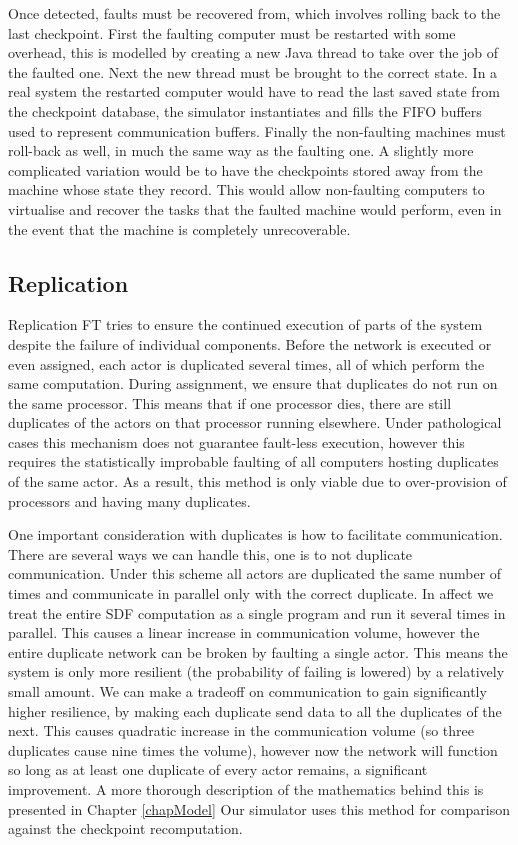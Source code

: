 Once detected, faults must be recovered from, which involves rolling back to the last checkpoint.
First the faulting computer must be restarted with some overhead, this is modelled by creating a new Java thread to take over the job of the faulted one.
Next the new thread must be brought to the correct state.
In a real system the restarted computer would have to read the last saved state from the checkpoint database, the simulator instantiates and fills the FIFO buffers used to represent communication buffers.
Finally the non-faulting machines must roll-back as well, in much the same way as the faulting one.
A slightly more complicated variation would be to have the checkpoints stored away from the machine whose state they record.
This would allow non-faulting computers to virtualise and recover the tasks that the faulted machine would perform, even in the event that the machine is completely unrecoverable.

\subsection{Replication}

Replication FT tries to ensure the continued execution of parts of the system despite the failure of individual components.
Before the network is executed or even assigned, each actor is duplicated several times, all of which perform the same computation.
During assignment, we ensure that duplicates do not run on the same processor.
This means that if one processor dies, there are still duplicates of the actors on that processor running elsewhere.
Under pathological cases this mechanism does not guarantee fault-less execution, however this requires the statistically improbable faulting of all computers hosting duplicates of the same actor.
As a result, this method is only viable due to over-provision of processors and having many duplicates.

One important consideration with duplicates is how to facilitate communication.
There are several ways we can handle this, one is to not duplicate communication.
Under this scheme all actors are duplicated the same number of times and communicate in parallel only with the correct duplicate.
In affect we treat the entire SDF computation as a single program and run it several times in parallel.
This causes a linear increase in communication volume, however the entire duplicate network can be broken by faulting a single actor.
This means the system is only more resilient (the probability of failing is lowered) by a relatively small amount.
We can make a tradeoff on communication to gain significantly higher resilience, by making each duplicate send data to all the duplicates of the next.
This causes quadratic increase in the communication volume (so three duplicates cause nine times the volume), however now the network will function so long as at least one duplicate of every actor remains, a significant improvement.
A more thorough description of the mathematics behind this is presented in Chapter \ref{chapModel}
Our simulator uses this method for comparison against the checkpoint recomputation.

